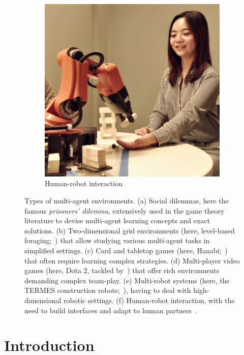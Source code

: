 \begin{figure}[h]
\begin{subfigure}[c]{0.27\textwidth}
        \includegraphics[width=\textwidth]{Figures/MADRL/hri.png}
        \caption{Human-robot interaction}
        \label{fig:hri}
    \end{subfigure}
    \caption{Types of multi-agent environments. (a) Social dilemmas, here the famous \textit{prisoners' dilemma}, extensively used in the game theory literature to devise multi-agent learning concepts and exact solutions. (b) Two-dimensional grid environments (here, level-based foraging;~\cite{Albrecht2013_Foraging}) that allow studying various multi-agent tasks in simplified settings. (c) Card and tabletop games (here, Hanabi;~\cite{Bard2020_Hanabi}) that often require learning complex strategies. (d) Multi-player video games (here, Dota 2, tackled by~\cite{OpenAI2019_DOTA2}) that offer rich environments demanding complex team-play. (e) Multi-robot systems (here, the TERMES construction robots;~\cite{Petersen2012_TERMES}), having to deal with high-dimensional robotic settings. (f) Human-robot interaction, with the need to build interfaces and adapt to human partners~\citep{Jung2020_TowerConstruct}.} 
    \label{fig:MAenvs}
\end{figure}


\section{Introduction}

